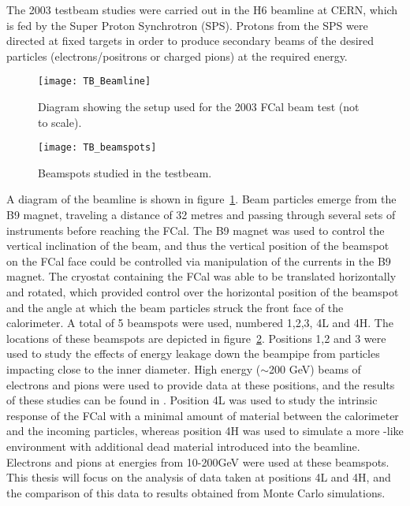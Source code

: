 The 2003 testbeam studies were carried out in the H6 beamline at CERN, which is fed by the Super Proton Synchrotron (SPS). Protons from the SPS were directed at fixed targets in order to produce secondary beams of the desired particles (electrons/positrons or charged pions) at the required energy.  

\begin{figure}[tbh]
\begin{center}
\texttt{[image: TB\_Beamline]}
\end{center}
\caption{Diagram showing the setup used for the 2003 FCal beam test (not to scale).}
\label{fig_TB_beamline}
\end{figure}

\begin{figure}[htb]
\begin{center}
\texttt{[image: TB\_beamspots]}
\end{center}
\caption{Beamspots studied in the testbeam.}
\label{fig_TB_beamspots}
\end{figure}

A diagram of the beamline is shown in figure~\ref{fig_TB_beamline}. Beam particles emerge from the B9 magnet, traveling a distance of 32 metres and passing through several sets of instruments before reaching the FCal. The B9 magnet was used to control the vertical inclination of the beam, and thus the vertical position of the beamspot on the FCal face could be controlled via manipulation of the currents in the B9 magnet. The cryostat containing the FCal was able to be translated horizontally and rotated, which provided control over the horizontal position of the beamspot and the angle at which the beam particles struck the front face of the calorimeter. A total of 5 beamspots were used, numbered 1,2,3, 4L and 4H. The locations of these beamspots are depicted in figure~\ref{fig_TB_beamspots}. Positions 1,2 and 3 were used to study the effects of energy leakage down the beampipe from particles impacting close to the inner diameter. High energy ($\sim$200 GeV) beams of electrons and pions were used to provide data at these positions, and the results of these studies can be found in \cite{LouiseThesis,TB03_tbp}. Position 4L was used to study the intrinsic response of the FCal with a minimal amount of material between the calorimeter and the incoming particles, whereas position 4H was used to simulate a more \atlas-like environment with additional dead material introduced into the beamline. Electrons and pions at energies from 10-200GeV were used at these beamspots. This thesis will focus on the analysis of data taken at positions 4L and 4H, and the comparison of this data to results obtained from Monte Carlo simulations.
 



